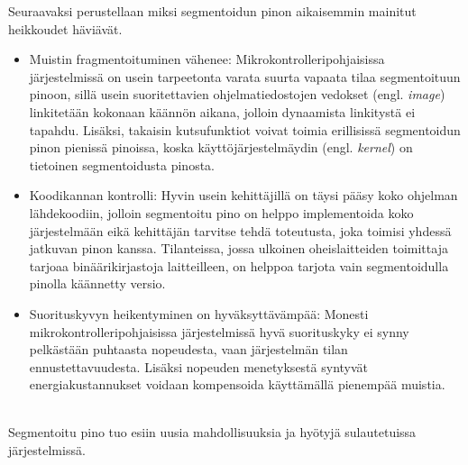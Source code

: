 Seuraavaksi perustellaan miksi segmentoidun pinon aikaisemmin mainitut heikkoudet häviävät.
~\\
\begin{itemize}
    \item{Muistin fragmentoituminen vähenee: Mikrokontrolleripohjaisissa järjestelmissä on usein tarpeetonta varata suurta vapaata tilaa segmentoituun pinoon, sillä usein suoritettavien ohjelmatiedostojen vedokset (engl. \textit{image}) linkitetään kokonaan käännön aikana, jolloin dynaamista linkitystä ei tapahdu. Lisäksi, takaisin kutsufunktiot voivat toimia erillisissä segmentoidun pinon pienissä pinoissa, koska käyttöjärjestelmäydin (engl. \textit{kernel}) on tietoinen segmentoidusta pinosta.}\cite{bsstes@2023}
    \item{Koodikannan kontrolli: Hyvin usein kehittäjillä on täysi pääsy koko ohjelman lähdekoodiin, jolloin segmentoitu pino on helppo implementoida koko järjestelmään eikä kehittäjän tarvitse tehdä toteutusta, joka toimisi yhdessä jatkuvan pinon kanssa. Tilanteissa, jossa ulkoinen oheislaitteiden toimittaja tarjoaa binäärikirjastoja laitteilleen, on helppoa tarjota vain segmentoidulla pinolla käännetty versio.}\cite{bsstes@2023}
    \item{Suorituskyvyn heikentyminen on hyväksyttävämpää: Monesti mikrokontrolleripohjaisissa järjestelmissä hyvä suorituskyky ei synny pelkästään puhtaasta nopeudesta, vaan järjestelmän tilan ennustettavuudesta. Lisäksi nopeuden menetyksestä syntyvät energiakustannukset voidaan kompensoida käyttämällä pienempää muistia.}\cite{bsstes@2023}
\end{itemize}
~\\
Segmentoitu pino tuo esiin uusia mahdollisuuksia ja hyötyjä sulautetuissa järjestelmissä.
